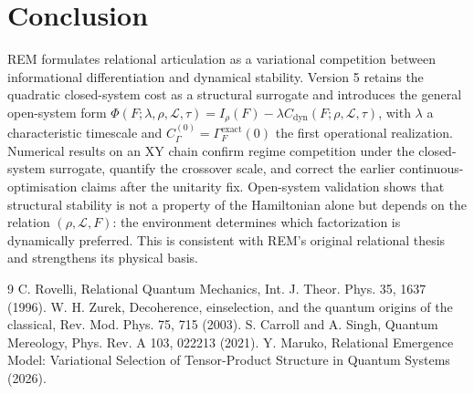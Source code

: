 \documentclass[11pt]{article}
\begin{document}
\section{Conclusion}
REM formulates relational articulation as a variational competition between informational differentiation and dynamical stability. Version 5 retains the quadratic closed-system cost as a structural surrogate and introduces the general open-system form $\Phi(F;\lambda,\rho,\mathcal L,\tau)=I_\rho(F)-\lambda C_{\mathrm{dyn}}(F;\rho,\mathcal L,\tau)$, with $\lambda$ a characteristic timescale and $C_\Gamma^{(0)}=\Gamma_F^{\mathrm{exact}}(0)$ the first operational realization. Numerical results on an XY chain confirm regime competition under the closed-system surrogate, quantify the crossover scale, and correct the earlier continuous-optimisation claims after the unitarity fix. Open-system validation shows that structural stability is not a property of the Hamiltonian alone but depends on the relation $(\rho,\mathcal L,F)$: the environment determines which factorization is dynamically preferred. This is consistent with REM's original relational thesis and strengthens its physical basis.

\begin{thebibliography}{9}
 C. Rovelli, Relational Quantum Mechanics, Int. J. Theor. Phys. 35, 1637 (1996).
 W. H. Zurek, Decoherence, einselection, and the quantum origins of the classical, Rev. Mod. Phys. 75, 715 (2003).
 S. Carroll and A. Singh, Quantum Mereology, Phys. Rev. A 103, 022213 (2021).
 Y. Maruko, Relational Emergence Model: Variational Selection of Tensor-Product Structure in Quantum Systems (2026).
\end{thebibliography}
\end{document}
